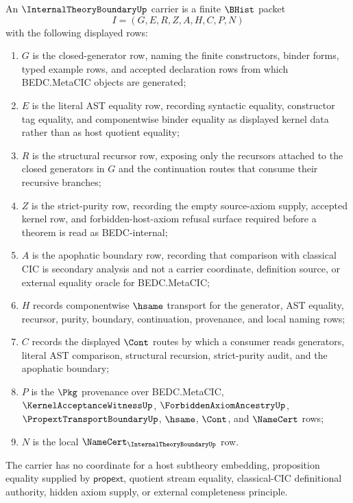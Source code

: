 \begin{definition}
\label{def:internal-theory-boundary-carrier}
An $\InternalTheoryBoundaryUp$ carrier is a finite $\BHist$ packet
$$
I=(G,E,R,Z,A,H,C,P,N)
$$
with the following displayed rows:
\begin{enumerate}
\item $G$ is the closed-generator row, naming the finite constructors, binder forms, typed example rows, and accepted declaration rows from which BEDC.MetaCIC objects are generated;
\item $E$ is the literal AST equality row, recording syntactic equality, constructor tag equality, and componentwise binder equality as displayed kernel data rather than as host quotient equality;
\item $R$ is the structural recursor row, exposing only the recursors attached to the closed generators in $G$ and the continuation routes that consume their recursive branches;
\item $Z$ is the strict-purity row, recording the empty source-axiom supply, accepted kernel row, and forbidden-host-axiom refusal surface required before a theorem is read as BEDC-internal;
\item $A$ is the apophatic boundary row, recording that comparison with classical CIC is secondary analysis and not a carrier coordinate, definition source, or external equality oracle for BEDC.MetaCIC;
\item $H$ records componentwise $\hsame$ transport for the generator, AST equality, recursor, purity, boundary, continuation, provenance, and local naming rows;
\item $C$ records the displayed $\Cont$ routes by which a consumer reads generators, literal AST comparison, structural recursion, strict-purity audit, and the apophatic boundary;
\item $P$ is the $\Pkg$ provenance over BEDC.MetaCIC, $\KernelAcceptanceWitnessUp$, $\ForbiddenAxiomAncestryUp$, $\PropextTransportBoundaryUp$, $\hsame$, $\Cont$, and $\NameCert$ rows;
\item $N$ is the local $\NameCert_{\InternalTheoryBoundaryUp}$ row.
\end{enumerate}
The carrier has no coordinate for a host subtheory embedding, proposition equality supplied by $\mathsf{propext}$, quotient stream equality, classical-CIC definitional authority, hidden axiom supply, or external completeness principle.
\end{definition}

